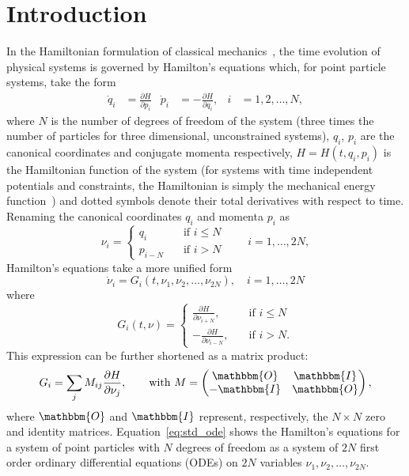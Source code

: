 \documentclass{iopart}
\newcommand{\pd}[2]{\frac{\partial#1}{\partial#2}}
\begin{document}
\section{Introduction}
In the Hamiltonian formulation of classical mechanics~\cite{gol:1980, fw:2003},
the time evolution of physical systems is governed by Hamilton's equations
which, for point particle systems, take the form
\begin{align}\label{eq:heqs}
  \dot q_i&=\pd{H}{p_i}&
  \dot p_i&=-\pd{H}{q_i},&
  i&=1, 2, \ldots, N,
\end{align}
where $N$ is the number of degrees of freedom of the system (three times the
number of particles for three dimensional, unconstrained systems), $q_i$, $p_i$
are the canonical coordinates and conjugate momenta respectively, $H=H(t, q_i,
p_i)$ is the Hamiltonian function of the system (for systems with time
independent potentials and constraints, the Hamiltonian is simply the
mechanical energy function~\cite{fw:2003}) and dotted symbols denote their
total derivatives with respect to time. 
Renaming the canonical coordinates $q_i$ and momenta $p_i$ as
\begin{equation}\label{eq:xinot}
  \nu_i = 
  \begin{cases}
    q_i&\quad\text{if }i\leq N\\
    p_{i-N}&\quad\text{if }i> N
  \end{cases}
  \qquad i=1, \ldots, 2N,
\end{equation}
Hamilton's equations take a more unified form
\begin{equation}\label{eq:std_ode}
  \dot \nu_i=G_i(t, \nu_1, \nu_2, \ldots, \nu_{2N}), \quad i=1, \ldots, 2N
\end{equation}
where
\begin{equation}
  G_i(t, \nu)=
  \begin{cases}\displaystyle
    \pd{H}{\nu_{i+N}} ,&\quad\text{if }i\leq N\\[1em]
    \displaystyle
    -\pd{H}{\nu_{i-N}}, &\quad\text{if }i> N.
  \end{cases}
\end{equation}
This expression can be further shortened as a matrix product:
\begin{equation}\label{eq:rhsmf}
  G_i= \sum_j M_{i j}\pd{H}{\nu_j},\qquad
  \text{with }
  M=
  \begin{pmatrix}
    \mathbbm{O}&\mathbbm{I}\\
    -\mathbbm{I}&\mathbbm{O}
  \end{pmatrix},
\end{equation}
where $\mathbbm{O}$ and $\mathbbm{I}$ represent, respectively, the $N\times N$
zero and identity matrices.  Equation~\eqref{eq:std_ode} shows the Hamilton's
equations for a system of point particles with $N$ degrees of freedom as a
system of $2N$ first order ordinary differential equations (ODEs) on $2N$
variables $\nu_1, \nu_2, \ldots, \nu_{2N}$.
\end{document}
